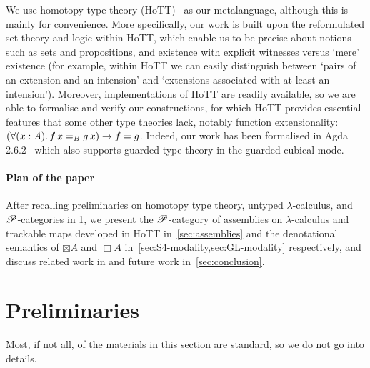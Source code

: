 \documentclass[a4paper,UKenglish,numberwithinsect,cleveref,thm-restate,draft]{lipics-v2021}
\numberwithin{equation}{section}
\theoremstyle{definition}
\theoremstyle{plain}
\begin{document}
We use homotopy type theory (HoTT)~\cite{hottbook} as our metalanguage, although this is mainly for convenience.%
More specifically, our work is built upon the reformulated set theory and logic within HoTT, which enable us to be precise about notions such as sets and propositions, and existence with explicit witnesses versus `mere' existence (for example, within HoTT we can easily distinguish between `pairs of an extension and an intension' and `extensions associated with at least an intension').
Moreover, implementations of HoTT are readily available, so we are able to formalise and verify our constructions, for which HoTT provides essential features that some other type theories lack, notably function extensionality: $\left(\fall{x : A} f\,x =_B g\,x\right) \to f = g$.
Indeed, our work has been formalised in Agda 2.6.2~\cite{Agda} which also supports guarded type theory in the guarded cubical mode.%


\paragraph*{Plan of the paper}
After recalling preliminaries on homotopy type theory, untyped $\lambda$-calculus, and $\mathscr{P}$-categories in \cref{sec:preliminaries}, we present the $\mathscr{P}$-category of assemblies on $\lambda$-calculus and trackable maps developed in HoTT in~\cref{sec:assemblies} and the denotational semantics of $\boxtimes A$ and $\Box A$ in~\cref{sec:S4-modality,sec:GL-modality} respectively, and discuss related work in  and future work in~\cref{sec:conclusion}.

\section{Preliminaries}\label{sec:preliminaries}
Most, if not all, of the materials in this section are standard, so we do not go into details.
\end{document}

